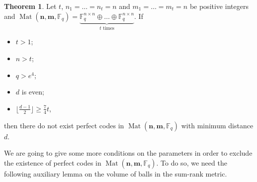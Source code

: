 \documentclass[11pt]{amsart}
\DeclareMathOperator{\Mat}{Mat}
\theoremstyle{definition}
\newtheorem{theorem}{Theorem}[section]
\newtheorem{proposition}[theorem]{Proposition}
\newcommand{\F}{{\mathbb F}}
\newcommand{\bfn}{\mathbf {n}}
\newcommand{\bfm}{\mathbf {m}}
\newcommand{\spacmn}{\Mat(\bfn,\bfm,\F_q)}
\begin{document}
\begin{theorem}\label{thm:dlarg2}
Let $t$, $ n_1 = \ldots = n_t = n $ and $ m_1 = \ldots = m_t = n $ be positive integers and $\spacmn=\underbrace{\mathbb{F}_q^{n\times n}\oplus \ldots \oplus \F_q^{n\times n}}_{t \text{ times}}$.
If 
\begin{itemize}
    \item $t>1$;
    \item $n>t$;
    \item $q>e^4$;
    \item $d$ is even;
    \item $\lfloor \frac{d-1}2\rfloor\geq \frac{7}4t$,
\end{itemize}
then there do not exist perfect codes in $\spacmn$ with minimum distance $d$.
\end{theorem}

We are going to give some more conditions on the parameters in order to exclude the existence of perfect codes in $\spacmn$.
To do so, we need the following auxiliary lemma on the volume of balls in the sum-rank metric.

\end{document}
